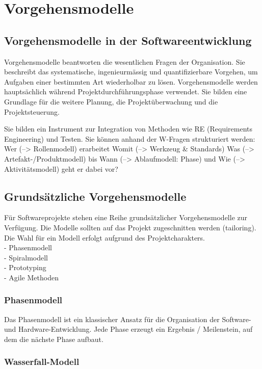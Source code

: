 \chapter{Vorgehensmodelle}

\section{Vorgehensmodelle in der Softwareentwicklung}

Vorgehensmodelle beantworten die wesentlichen Fragen der 
Organisation. Sie beschreibt das systematische, ingenieurmässig und quantifizierbare Vorgehen, um Aufgaben einer 
bestimmten Art wiederholbar zu lösen. Vorgehensmodelle werden hauptsächlich während Projektdurchführungsphase verwendet. Sie bilden eine Grundlage für die weitere Planung, die Projektüberwachung und die Projektsteuerung.

Sie bilden ein Instrument zur Integration von Methoden wie RE (Requirements Engineering) und Testen. Sie können anhand der W-Fragen strukturiert werden: Wer (--> Rollenmodell) erarbeitet Womit (--> Werkzeug \& Standards) Was (--> Artefakt-/Produktmodell) bis Wann (--> Ablaufmodell: Phase) und Wie (--> Aktivitätsmodell) geht er dabei vor? 

\section{Grundsätzliche Vorgehensmodelle}

Für Softwareprojekte stehen eine Reihe grundsätzlicher Vorgehensmodelle zur Verfügung. Die Modelle sollten auf das Projekt zugeschnitten werden (tailoring). Die Wahl für ein Modell erfolgt aufgrund des Projektcharakters.  \\
- Phasenmodell \\
- Spiralmodell \\
- Prototyping \\
- Agile Methoden \\

\subsection{Phasenmodell}
Das Phasenmodell ist ein klassischer Ansatz für die Organisation der Software- und Hardware-Entwicklung. Jede Phase erzeugt ein Ergebnis / Meilenstein, auf dem die nächste Phase aufbaut.

\subsection{Wasserfall-Modell}

